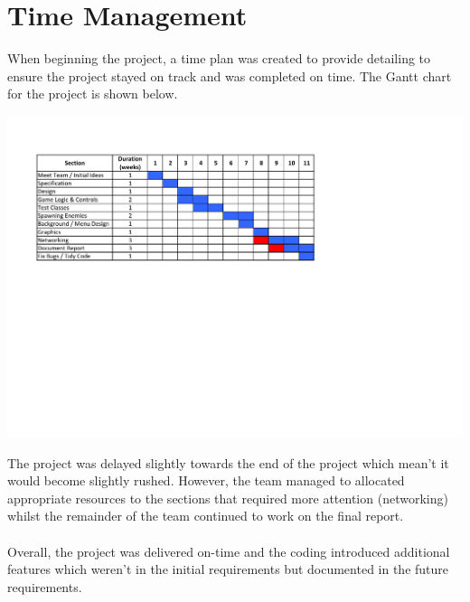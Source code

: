 \section{Time Management}
\label{sec: time_management}
When beginning the project, a time plan was created to provide detailing to ensure the project stayed on track and was completed on time. The Gantt chart for the project is shown below.
\begin{center}
\includegraphics[width=16cm]{gantt.pdf}
\end{center}
The project was delayed slightly towards the end of the project which mean't it would become slightly rushed. However, the team managed to allocated appropriate resources to the sections that required more attention (networking) whilst the remainder of the team continued to work on the final report.\\\\
Overall, the project was delivered on-time and the coding introduced additional features which weren't in the initial requirements but documented in the future requirements.

